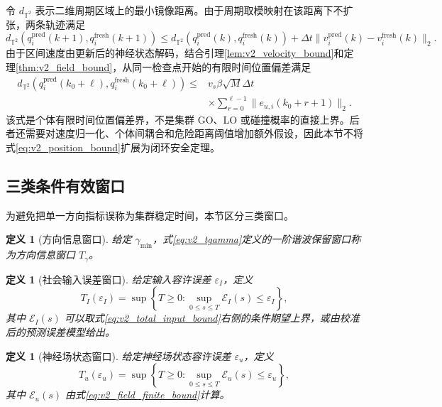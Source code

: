 \documentclass[UTF8,fontset=windows,11pt]{ctexart}
\newtheorem{definition}[theorem]{定义}
\newcommand{\Ttwo}{\mathbb T^2}
\begin{document}
令 $d_{\Ttwo}$ 表示二维周期区域上的最小镜像距离。由于周期取模映射在该距离下不扩张，两条轨迹满足
\begin{equation}
 d_{\Ttwo}(q_i^{\mathrm{pred}}(k+1),q_i^{\mathrm{fresh}}(k+1))
 \le d_{\Ttwo}(q_i^{\mathrm{pred}}(k),q_i^{\mathrm{fresh}}(k))
 +\Delta t\|v_i^{\mathrm{pred}}(k)-v_i^{\mathrm{fresh}}(k)\|_2.
 \label{eq:v2_position_step}
\end{equation}
由于区间速度由更新后的神经状态解码，结合引理\ref{lem:v2_velocity_bound}和定理\ref{thm:v2_field_bound}，从同一检查点开始的有限时间位置偏差满足
\begin{equation}
 \begin{aligned}
 d_{\Ttwo}(q_i^{\mathrm{pred}}(k_0+\ell),q_i^{\mathrm{fresh}}(k_0+\ell))
 \le{}&v_s\beta\sqrt M\Delta t\\
 &\times\sum_{r=0}^{\ell-1}\|e_{u,i}(k_0+r+1)\|_2.
 \end{aligned}
 \label{eq:v2_position_bound}
\end{equation}
该式是个体有限时间位置偏差界，不是集群 GO、LO 或碰撞概率的直接上界。后者还需要对速度归一化、个体间耦合和危险距离阈值增加额外假设，因此本节不将式\eqref{eq:v2_position_bound}扩展为闭环安全定理。

\subsection{三类条件有效窗口}

为避免把单一方向指标误称为集群稳定时间，本节区分三类窗口。

\begin{definition}[方向信息窗口]
\label{def:v2_direction_window}
给定 $\gamma_{\min}$，式\eqref{eq:v2_tgamma}定义的一阶谐波保留窗口称为方向信息窗口 $T_\gamma$。
\end{definition}

\begin{definition}[社会输入误差窗口]
\label{def:v2_input_window}
给定输入容许误差 $\varepsilon_I$，定义
\begin{equation}
 T_I(\varepsilon_I)=\sup\left\{T\ge0:
 \sup_{0\le s\le T}\mathcal E_I(s)\le\varepsilon_I\right\},
 \label{eq:v2_input_window}
\end{equation}
其中 $\mathcal E_I(s)$ 可以取式\eqref{eq:v2_total_input_bound}右侧的条件期望上界，或由校准后的预测误差模型给出。
\end{definition}

\begin{definition}[神经场状态窗口]
\label{def:v2_field_window}
给定神经场状态容许误差 $\varepsilon_u$，定义
\begin{equation}
 T_u(\varepsilon_u)=\sup\left\{T\ge0:
 \sup_{0\le s\le T}\mathcal E_u(s)\le\varepsilon_u\right\},
 \label{eq:v2_field_window}
\end{equation}
其中 $\mathcal E_u(s)$ 由式\eqref{eq:v2_field_finite_bound}计算。
\end{definition}
\end{document}

